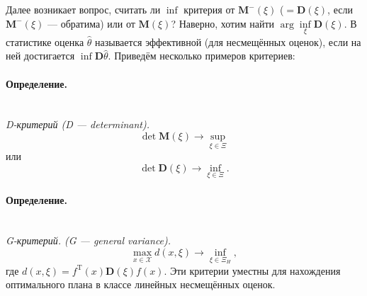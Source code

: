 \documentclass[12pt, a4paper]{article}
\newenvironment{definition}{\paragraph{Определение.}\hfill\\}{}
\begin{document}
	Далее возникает вопрос, считать ли $\inf$ критерия от $\mathbf{M}^-(\xi)$ ($=\mathbf{D}(\xi)$, если $\mathbf{M}^-(\xi)$ --- обратима) или от $\mathbf{M}(\xi)$? Наверно, хотим найти $\arg\inf\limits_\xi\mathbf{D}(\xi)$. В статистике оценка $\hat{\theta}$ называется эффективной (для несмещённых оценок), если на ней достигается $\inf\mathbf{D}\hat{\theta}$.
	Приведём несколько примеров критериев:
	\begin{definition}
		\textit{D-критерий (D --- determinant).}
		\begin{equation*}
			\det\mathbf{M}(\xi)\rightarrow\sup_{\xi\in\Xi}
		\end{equation*}
		или
		\begin{equation*}
			\det\mathbf{D}(\xi)\rightarrow\inf_{\xi\in\Xi}.
		\end{equation*}
	\end{definition}
	\begin{definition}
		\textit{G-критерий. (G --- general variance).}
		\begin{equation*}
			\max_{x\in\mathcal{X}}d(x,\xi)\rightarrow\inf_{\xi\in\Xi_H},
		\end{equation*}
		где $d(x,\xi)=f^\mathrm{T}(x)\mathbf{D}(\xi)f(x)$.
	\end{definition}
	Эти критерии уместны для нахождения оптимального плана в классе линейных несмещённых оценок.
\end{document}
